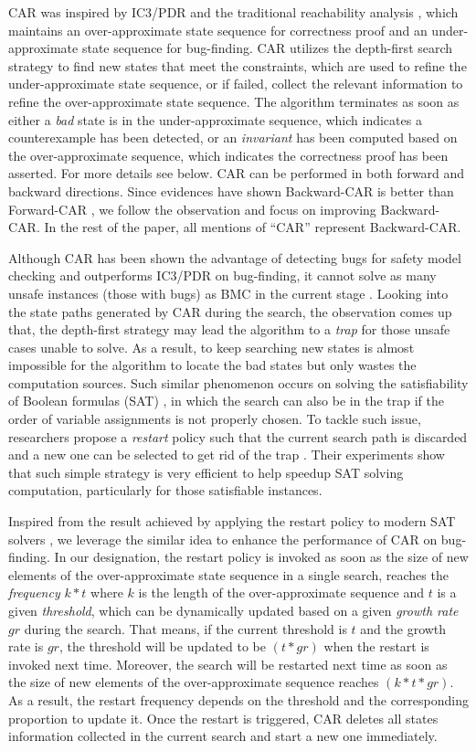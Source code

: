 CAR was inspired by IC3/PDR and the traditional reachability analysis \cite{LZZPV17}, which maintains an over-approximate state sequence for correctness proof and an under-approximate state sequence for bug-finding. CAR utilizes the depth-first search strategy to find new states that meet the constraints, which are used to refine the under-approximate state sequence, or if failed, collect the relevant  information to refine the over-approximate state sequence. The algorithm terminates as soon as either a \emph{bad} state is in the under-approximate sequence, which indicates a counterexample has been detected, or an \emph{invariant} has been computed based on the over-approximate sequence, which indicates the correctness proof has been asserted.  For more details see below. CAR can be performed in both forward and backward directions. Since evidences have shown Backward-CAR is better than Forward-CAR \cite{LDPRV18}, we follow the observation and focus on improving Backward-CAR. In the rest of the paper, all mentions of ``CAR'' represent Backward-CAR. 

Although CAR has been shown the advantage of detecting bugs for safety model checking and outperforms IC3/PDR on bug-finding, it cannot solve as many unsafe instances (those with bugs) as BMC in the current stage \cite{DLPVR19}. Looking into the state paths generated by CAR during the search, the observation comes up that, the depth-first strategy may lead the algorithm to a \emph{trap} for those unsafe cases unable to solve. As a result, to keep searching new states is almost impossible for the algorithm to locate the bad states but only wastes the computation sources. Such similar phenomenon occurs on solving the satisfiability of Boolean formulas (SAT) \cite{VWM15}, in which the search can also be in the trap if the order of variable assignments is not properly chosen. To tackle such issue, researchers propose a \emph{restart} policy such that the current search path is discarded and a new one can be selected to get rid of the trap \cite{Biere08}. Their experiments show that such simple strategy is very efficient to help speedup  SAT solving computation, particularly for those satisfiable instances. 

Inspired from the result achieved by applying the restart policy to modern SAT solvers \cite{Biere08}, we leverage the similar idea to enhance the performance of CAR on bug-finding. In our designation, the restart policy is invoked as soon as the size of new elements of the over-approximate state sequence in a single search, reaches the \emph{frequency} $k*t$ where $k$ is the length of the over-approximate sequence and $t$ is a given  \emph{threshold}, which can be dynamically updated based on a given \emph{growth rate} $gr$ during the search. That means, if the current threshold is $t$ and the growth rate is $gr$, the threshold will be updated to be $(t*gr)$ when the restart is invoked next time. Moreover, the search will be restarted next time as soon as the size of new elements of the over-approximate sequence reaches $(k*t*gr)$. As a result, the restart frequency depends on the threshold and the corresponding proportion to update it. Once the restart is triggered, CAR deletes all states information collected in the current search and start a new one immediately. 


